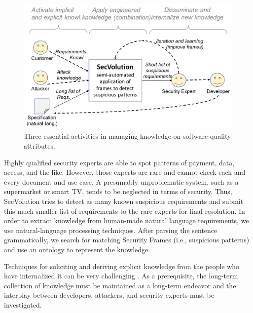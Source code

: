 \begin{figure}
    \centering
    \includegraphics[width=\columnwidth]{figs/nnnOben}
    \caption{Three essential activities in managing knowledge on software quality attributes.}
    \label{fig:nnnOben}
\end{figure}

Highly qualified security experts are able to spot patterns of payment, data, access, and the like. 
However, those experts are rare and cannot check each and every document and use case. 
A presumably unproblematic system, such as a supermarket or smart TV, tends to be neglected in terms of security. 
Thus, SecVolution tries to detect as many known suspicious requirements and submit this much smaller list of requirements to the rare experts for final resolution. 
In order to extract knowledge from human-made natural language requirements, we use natural-language processing techniques. 
After parsing the sentence grammatically, we search for matching Security Frames (i.e., suspicious patterns) and use an ontology to represent the knowledge. 


Techniques for soliciting and deriving explicit knowledge from the people who have internalized it can be very challenging \cite{Gaertner2014}. 
As a prerequisite, the long-term collection of knowledge must be maintained as a long-term endeavor and the interplay between developers, attackers, and security experts must be investigated. 
